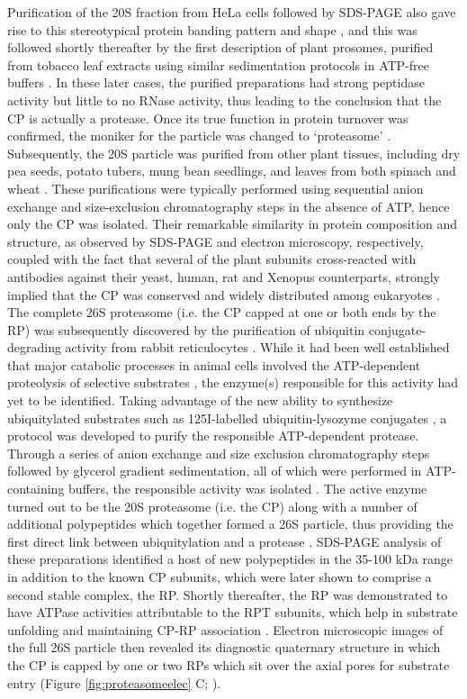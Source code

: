 	  Purification of the 20S fraction from HeLa cells followed by SDS-PAGE also gave rise to this stereotypical protein banding pattern and shape \citep{schmid84}, and this was followed shortly thereafter by the first description of plant prosomes, purified from tobacco leaf extracts using similar sedimentation protocols in ATP-free buffers \citep{kremp86}.  In these later cases, the purified preparations had strong peptidase activity but little to no RNase activity, thus leading to the conclusion that the CP is actually a protease.  Once its true function in protein turnover was confirmed, the moniker for the particle was changed to `proteasome' \citep{arrigo88}.  
	Subsequently, the 20S particle was purified from other plant tissues, including dry pea seeds, potato tubers, mung bean seedlings, and leaves from both spinach and wheat \citep{murray97, ozaki92, schliephacke91, skoda92}.  These purifications were typically performed using sequential anion exchange and size-exclusion chromatography steps in the absence of ATP, hence only the CP was isolated.  Their remarkable similarity in protein composition and structure, as observed by SDS-PAGE and electron microscopy, respectively, coupled with the fact that several of the plant subunits cross-reacted with antibodies against their yeast, human, rat and Xenopus counterparts, strongly implied that the CP was conserved and widely distributed among eukaryotes \citep{schliephacke91}.
The complete 26S proteasome (i.e. the CP capped at one or both ends by the RP) was subsequently discovered by the purification of ubiquitin conjugate-degrading activity from rabbit reticulocytes \citep{hough86}.  While it had been well established that major catabolic processes in animal cells involved the ATP-dependent proteolysis of selective substrates \citep{etlinger77}, the enzyme(s) responsible for this activity had yet to be identified.  Taking advantage of the new ability to synthesize ubiquitylated substrates such as 125I-labelled ubiquitin-lysozyme conjugates \citep{hough86-1xVPf}, a protocol was developed to purify the responsible ATP-dependent protease.  Through a series of anion exchange and size exclusion chromatography steps followed by glycerol gradient sedimentation, all of which were performed in ATP-containing buffers, the responsible activity was isolated \citep{hough86, hough87}. The active enzyme turned out to be the 20S proteasome (i.e. the CP) along with a number of additional polypeptides which together formed a 26S particle, thus providing the first direct link between ubiquitylation and a protease \citep{ganoth88, hough87, waxman87}.  SDS-PAGE analysis of these preparations identified a host of new polypeptides in the 35-100 kDa range in addition to the known CP subunits, which were later shown to comprise a second stable complex, the RP.  Shortly thereafter, the RP was demonstrated to have ATPase activities attributable to the RPT subunits, which help in substrate unfolding and maintaining CP-RP association \citep{armon90}.  Electron microscopic images of the full 26S particle then revealed its diagnostic quaternary structure in which the CP is capped by one or two RPs which sit over the axial pores for substrate entry (Figure \ref{fig:proteasomeelec} C; \citep{peters91, yoshimura93}).
